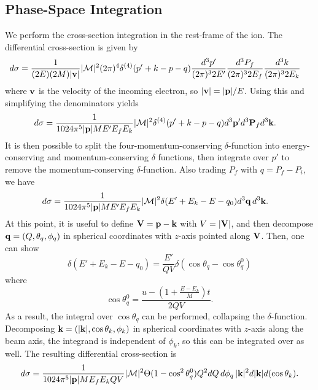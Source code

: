 \subsection{Phase-Space Integration}
We perform the cross-section integration in the rest-frame of the ion. The differential cross-section is given by
\begin{align}
    d\sigma &= \frac{1}{(2E)(2M)|{\bf v}|}|{\cal M}|^2 (2\pi)^4 \delta^{(4)}(p' + k - p - q)\frac{d^3 p'}{(2\pi)^3 2E'}\frac{d^3 P_f}{(2\pi)^3 2E_f}\frac{d^3 k}{(2\pi)^3 2E_k}
\end{align}
where ${\bf v}$ is the velocity of the incoming electron, so $|{\bf v}| = |{\bf p}|/E$. Using this and simplifying the denominators yields
\begin{align}
    d\sigma &= \frac{1}{1024 \pi^5 |{\bf p}| M E'E_f E_k}|{\cal M}|^2\delta^{(4)}(p' + k - p - q) d^3 {\bf p}' d^3 {\bf P}_f d^3{\bf k}.
\end{align}
It is then possible to split the four-momentum-conserving $\delta$-function into energy- conserving and momentum-conserving $\delta$ functions, then integrate over $p'$ to remove the momentum-conserving $\delta$-function. Also trading $P_f$ with $q = P_f - P_i$, we have  
\begin{align}
    d\sigma &= \frac{1}{1024 \pi^5 |{\bf p}| M E'E_f E_k}|{\cal M}|^2\delta(E' + E_k - E - q_0) d^3 {\bf q}\,d^3{\bf k}.
\end{align}
At this point, it is useful to define ${\bf V} = {\bf p} - {\bf k}$ with $V = |{\bf V}|$, and then decompose ${\bf q}=(Q, \theta_q, \phi_q)$ in spherical coordinates with $z$-axis pointed along ${\bf V}$. Then, one can show
\begin{equation}
    \delta(E' + E_k - E - q_0) = \frac{E'}{QV}\delta(\cos{\theta_q} - \cos{\theta_q^0})
\end{equation}
where 
\begin{equation}
\cos{\theta_q^0} = \frac{u - \left(1+\frac{E-E_k}{M}\right)t}{2QV}.
\end{equation}
As a result, the integral over $\cos{\theta_q}$ can be performed, collapsing the $\delta$-function. Decomposing ${\bf k} = (|{\bf k}|, \cos{\theta_k}, \phi_k)$ in spherical coordinates with $z$-axis along the beam axis, the integrand is independent of $\phi_k$, so this can be integrated over as well. The resulting differential cross-section is 
\begin{align}
    d\sigma = \frac{1}{1024\pi^5|{\bf p}|ME_f E_k QV}|{\cal M}|^2\Theta(1 - \cos^2{\theta_q^0})Q^2 dQ\,d\phi_q\,|{\bf k}|^2 d|{\bf k}|d(\cos{\theta_k}).
\end{align}
